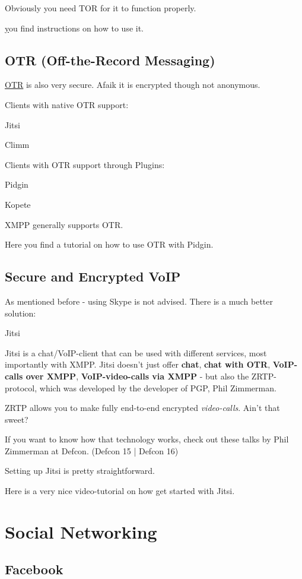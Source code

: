 \documentclass{article}
\begin{document}
 Obviously you need TOR for it to function properly.


 \href{Here} you find instructions on how to use it.
\subsection{OTR (Off-the-Record Messaging)}


 \href{https://en.wikipedia.org/wiki/Off-the-Record_Messaging}{OTR} is also very secure. Afaik it is encrypted though not anonymous.


 Clients with native OTR support:


 Jitsi

Climm


 Clients with OTR support through Plugins:


 Pidgin

Kopete


 XMPP generally supports OTR.


 Here you find a tutorial on how to use OTR with Pidgin.
\subsection{Secure and Encrypted VoIP}


 As mentioned before - using Skype is not advised. There is a much better solution:


 Jitsi


 Jitsi is a chat/VoIP-client that can be used with different services, most importantly with XMPP. Jitsi doesn't just offer \textbf{chat}, \textbf{chat with OTR}, \textbf{VoIP-calls over XMPP}, \textbf{VoIP-video-calls via XMPP} - but also the ZRTP-protocol, which was developed by the developer of PGP, Phil Zimmerman. 


 ZRTP allows you to make fully end-to-end encrypted \emph{video-calls}. Ain't that sweet? 


 If you want to know how that technology works, check out these talks by Phil Zimmerman at Defcon. (Defcon 15 | Defcon 16)


 Setting up Jitsi is pretty straightforward. 


 Here is a very nice video-tutorial on how get started with Jitsi.
\section{Social Networking}
\subsection{Facebook}
\end{document}
